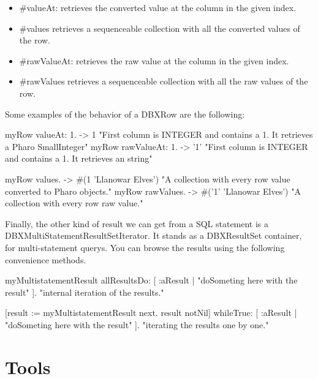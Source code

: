 \documentclass[a4paper,10pt,twoside]{book}
\begin{document}
\begin{itemize}
    \item \#valueAt: retrieves the converted value at the column in the given index.
    \item \#values retrieves a sequenceable collection with all the converted values of the row.
    \item \#rawValueAt: retrieves the raw value at the column in the given index.
    \item \#rawValues retrieves a sequenceable collection with all the raw values of the row.
\end{itemize}

Some examples of the behavior of a DBXRow are the following:
\begin{code}{}
myRow valueAt: 1. -> 1          "First column is INTEGER and contains a 1. It retrieves a Pharo SmallInteger"
myRow rawValueAt: 1. -> '1'     "First column is INTEGER and contains a 1. It retrieves an string"

myRow values.    -> #(1 'Llanowar Elves')   "A collection with every row value converted to Pharo objects."
myRow rawValues. -> #('1' 'Llanowar Elves') "A collection with every row raw value."
\end{code}


Finally, the other kind of result we can get from a SQL statement is a DBXMultiStatementResultSetIterator.  It stands as a DBXResultSet container, for multi-statement querys.  You can browse the results using the following convenience methods.

\begin{code}{}
myMultistatementResult allResultsDo: [ :aResult | "doSometing here with the result" ].  "internal iteration of the results."

[result := myMultistatementResult next. result notNil] 
    whileTrue: [ :aResult | "doSometing here with the result" ].  "iterating the results one by one."
\end{code}


\section{Tools}
\end{document}
